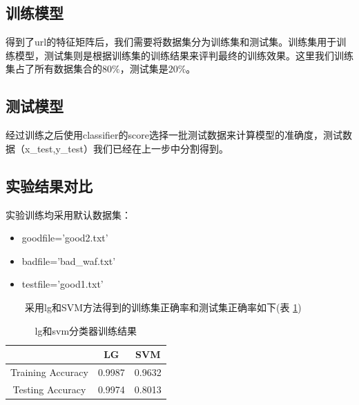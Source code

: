 \subsection{训练模型}
得到了url的特征矩阵后，我们需要将数据集分为训练集和测试集。训练集用于训练模型，测试集则是根据训练集的训练结果来评判最终的训练效果。这里我们训练集占了所有数据集合的$80\%$，测试集是$20\%$。
\subsection{测试模型}
经过训练之后使用classifier的score选择一批测试数据来计算模型的准确度，测试数据（x\_test,y\_test）我们已经在上一步中分割得到。
\subsection{实验结果对比}
实验训练均采用默认数据集：
\begin{itemize}
    \item goodfile='good2.txt'
    \item badfile='bad\_waf.txt'
    \item testfile='good1.txt'
\end{itemize}
\ \ \ \ 采用lg和SVM方法得到的训练集正确率和测试集正确率如下(表 \ref{table:no_keams})
\begin{table}[!ht]
    \setlength{\abovecaptionskip}{0.cm}
    \setlength{\belowcaptionskip}{-0.cm}
    \caption{lg和svm分类器训练结果}
    \centering
    \label{table:no_keams}    
    \begin{tabular}{|c|c|c|}
        \hline
        &LG&SVM\\
        \hline
        Training Accuracy&0.9987&0.9632\\
        \hline
        Testing Accuracy&0.9974&0.8013\\
        \hline
    \end{tabular}
\end{table}
